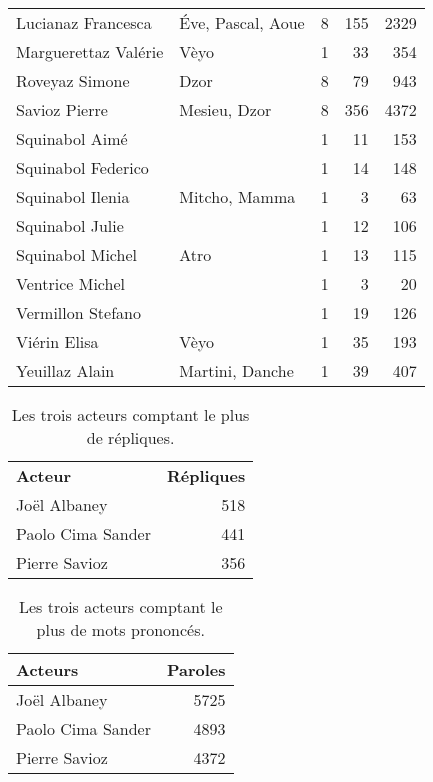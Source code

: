 \begin{longtable}{llrrr}
Lucianaz Francesca &Éve, Pascal, Aoue & 8 & 155 & 2329\\
Marguerettaz Valérie &Vèyo & 1 & 33 & 354\\
Roveyaz Simone &Dzor & 8 & 79 & 943\\
Savioz Pierre &Mesieu, Dzor & 8 & 356 & 4372\\
Squinabol Aimé & & 1 & 11 & 153\\
Squinabol Federico & & 1 & 14 & 148\\
Squinabol Ilenia &Mitcho, Mamma & 1 & 3 & 63\\
Squinabol Julie & & 1 & 12 & 106\\
Squinabol Michel &Atro & 1 & 13 & 115\\
Ventrice Michel & & 1 & 3 & 20\\
Vermillon Stefano & & 1 & 19 & 126\\
Viérin Elisa &Vèyo & 1 & 35 & 193\\
Yeuillaz Alain &Martini, Danche & 1 & 39 & 407\\
\bottomrule
\end{longtable}
\begin{table}[]
\centering
\caption{Les trois acteurs comptant le plus de répliques.}
\begin{tabular}{l|r}
\toprule
\multicolumn{1}{l}{\textbf{Acteur}} & \textbf{Répliques} \\

\multicolumn{1}{l}{Joël Albaney} &518\\
\multicolumn{1}{l}{Paolo Cima Sander} &441\\
\multicolumn{1}{l}{Pierre Savioz} &356\\
\bottomrule
\end{tabular}%
\end{table}
\newpage
\begin{table}[]
\centering
\caption{Les trois acteurs comptant le plus de mots prononcés.}
\begin{tabular}{l|r}
    \toprule
\multicolumn{1}{l}{\textbf{Acteurs}} & \textbf{Paroles} \\
    \midrule
\multicolumn{1}{l}{Joël Albaney} &5725\\
\multicolumn{1}{l}{Paolo Cima Sander} &4893\\
\multicolumn{1}{l}{Pierre Savioz} &4372\\
\bottomrule
\end{tabular}%
\end{table}
